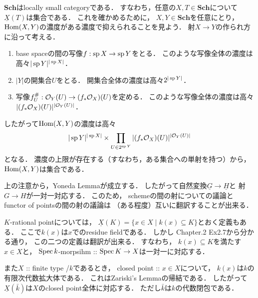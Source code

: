 \documentclass[a4paper]{jsarticle}
\newcommand{\Sch}{\mathbf{Sch}}
\newcommand{\ftor}[1]{\underline{#1}}
\begin{document}
    \begin{Remark}
        $\Sch$はlocally small categoryである．
        すなわち，任意の$X, T \in \Sch$について$\ftor{X}(T)$は集合である．
        これを確かめるために，
        $X, Y \in \Sch$を任意にとり，
        $\operatorname{Hom}(X,Y)$の濃度がある濃度で抑えられることを見よう．
        射$X \to Y$の作られ方に沿って考える．
        \begin{enumerate}[label=(\arabic*), leftmargin=*]
        \item
            base spaceの間の写像$f: \operatorname{sp} X \to \operatorname{sp} Y$をとる．
            このような写像全体の濃度は高々$|\operatorname{sp} Y|^{|\operatorname{sp} X|}$．
        \item
            $|Y|$の開集合$U$をとる．
            開集合全体の濃度は高々$2^{|\operatorname{sp} Y|}$．
        \item
            写像$f^{\#}_U: \mathcal{O}_Y(U) \to (f_* \mathcal{O}_X)(U)$を定める．
            このような写像全体の濃度は高々$|(f_* \mathcal{O}_X)(U)|^{|\mathcal{O}_Y(U)|}$．
        \end{enumerate}
        したがって$\operatorname{Hom}(X,Y)$の濃度は高々
        \[|\operatorname{sp} Y|^{|\operatorname{sp} X|} \times \prod_{U \in 2^{\operatorname{sp} Y}} |(f_* \mathcal{O}_X)(U)|^{|\mathcal{O}_Y(U)|} \]
        となる．
        濃度の上限が存在する（すなわち，ある集合への単射を持つ）から，
        $\operatorname{Hom}(X,Y)$は集合である．
    \end{Remark}

    \begin{Remark}
        上の注意から，Yoneda Lemmaが成立する．
        したがって自然変換$\ftor{G} \to \ftor{H}$と
        射$G \to H$が一対一対応する．
        このため，
        schemeの間の射についての議論と
        functor of pointsの間の射の議論は
        （ある程度）互いに翻訳することが出来る．
    \end{Remark}

    \begin{Remark}\label{remark:closedpoint}
        $K$-rational pointについては，
        $\ftor{X}(K)=\{ x \in X \mid k(x) \subseteq K \}$とおく定義もある．
        ここで$k(x)$は$x$でのresidue fieldである．
        しかし\cite{HarAG} Chapter.2 Ex2.7から分かる通り，
        この二つの定義は翻訳が出来る．
        すなわち，
        $k(x) \subseteq K$を満たす$x \in X$と，
        $\operatorname{Spec} k$-morpsihm :: $\operatorname{Spec} K \to X$は一対一に対応する．

        また$X$ :: finite type /$k$であるとき，
        closed point :: $x \in X$について，
        $k(x)$は$k$の有限次代数拡大体である．
        これはZariski's Lemmaの帰結である．
        したがって$\ftor{X}(\bar{k})$は$X$のclosed point全体に対応する．
        ただし$\bar{k}$は$k$の代数閉包である．
    \end{Remark}
\end{document}
